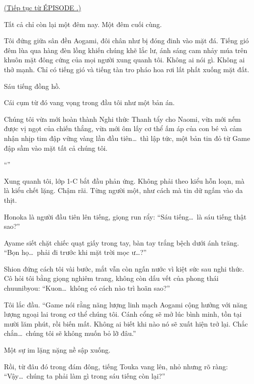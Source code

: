 \documentclass[../main.tex]{subfiles}
\begin{document}

\begin{center}
  \uline{(Tiếp tục từ {\flaregothic ÉPISODE }.)}
\end{center}

Tất cả chỉ còn lại một đêm nay. Một đêm cuối cùng.

Tôi đứng giữa sân đền Aogami, đôi chân như bị đóng đinh vào mặt đá. Tiếng gió đêm lùa qua hàng đèn lồng khiến chúng khẽ lắc lư, ánh sáng cam nhảy múa trên khuôn mặt đông cứng của mọi người xung quanh tôi. Không ai nói gì. Không ai thở mạnh. Chỉ có tiếng gió và tiếng tàn tro pháo hoa rơi lất phất xuống mặt đất.

Sáu tiếng đồng hồ.

Cái cụm từ đó vang vọng trong đầu tôi như một bản án.

Chúng tôi vừa mới hoàn thành Nghi thức Thanh tẩy cho Naomi, vừa mới nếm được vị ngọt của chiến thắng, vừa mới ôm lấy cơ thể ấm áp của con bé và cảm nhận nhịp tim đập vững vàng lần đầu tiên\dots\ thì lập tức, một bản tin đỏ từ Game đập sầm vào mặt tất cả chúng tôi.

``''

Xung quanh tôi, lớp 1-C bắt đầu phản ứng. Không phải theo kiểu hỗn loạn, mà là kiểu chết lặng. Chậm rãi. Từng người một, như cách mà tin dữ ngấm vào da thịt.

Honoka là người đầu tiên lên tiếng, giọng run rẩy: ``Sáu tiếng\dots\ là sáu tiếng thật sao?''

Ayame siết chặt chiếc quạt giấy trong tay, bàn tay trắng bệch dưới ánh trăng. ``Bọn họ\dots\ phải đi trước khi mặt trời mọc ư\dots?''

Shion đứng cách tôi vài bước, mắt vẫn còn ngấn nước vì kiệt sức sau nghi thức. Cô hỏi tôi bằng giọng nghiêm trang, không còn dấu vết của phong thái chuunibyou: ``Kuon\dots\ không có cách nào trì hoãn sao?''

Tôi lắc đầu. ``Game nói rằng năng lượng linh mạch Aogami cộng hưởng với năng lượng ngoại lai trong cơ thể chúng tôi. Cánh cổng sẽ mở lúc bình minh, tồn tại mười lăm phút, rồi biến mất. Không ai biết khi nào nó sẽ xuất hiện trở lại. Chắc chắn\dots\ chúng tôi sẽ không muốn bỏ lỡ đâu.''

Một sự im lặng nặng nề sập xuống.

Rồi, từ đâu đó trong đám đông, tiếng Touka vang lên, nhỏ nhưng rõ ràng: ``Vậy\dots\ chúng ta phải làm gì trong sáu tiếng còn lại?''
\end{document}
